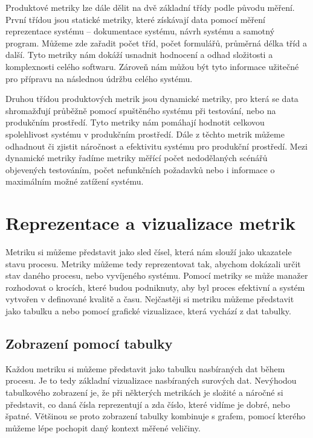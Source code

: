 \documentclass[czech,master]{diploma}
\begin{document}
Produktové metriky lze dále dělit na dvě základní třídy podle původu měření. První třídou jsou statické metriky, které získávají data pomocí měření reprezentace systému -- dokumentace systému, návrh systému a samotný program. Můžeme zde zařadit počet tříd, počet formulářů, průměrná délka tříd a další. Tyto metriky nám dokáží usnadnit hodnocení a odhad složitosti a komplexnosti celého softwaru. Zároveň nám můžou být tyto informace užitečné pro přípravu na následnou údržbu celého systému.

Druhou třídou produktových metrik jsou dynamické metriky, pro která se data shromažďují průběžně pomocí spuštěného systému při testování, nebo na produkčním prostředí. Tyto metriky nám pomáhají hodnotit celkovou spolehlivost systému v produkčním prostředí. Dále z těchto metrik můžeme odhadnout či zjistit náročnost a efektivitu systému pro produkční prostředí. Mezi dynamické metriky řadíme metriky měřící počet nedodělaných scénářů objevených testováním, počet nefunkčních požadavků nebo i informace o maximálním možné zatížení systému.

\section{Reprezentace a vizualizace metrik}
\label{sec:visualisation}
Metriku si můžeme představit jako sled čísel, která nám slouží jako ukazatele stavu procesu. Metriky můžeme tedy reprezentovat tak, abychom dokázali určit stav daného procesu, nebo vyvíjeného systému. Pomocí metriky se může manažer rozhodovat o krocích, které budou podniknuty, aby byl proces efektivní a systém vytvořen v definované kvalitě a času. Nejčastěji si metriku můžeme představit jako tabulku a nebo pomocí grafické vizualizace, která vychází z dat tabulky.


\subsection{Zobrazení pomocí tabulky}
Každou metriku si můžeme představit jako tabulku nasbíraných dat během procesu. Je to tedy základní vizualizace nasbíraných surových dat. Nevýhodou tabulkového zobrazení je, že při některých metrikách je složité a náročné si představit, co daná čísla reprezentují a zda číslo, které vidíme je dobré, nebo špatné. Většinou se proto zobrazení tabulky kombinuje s grafem, pomocí kterého můžeme lépe pochopit daný kontext měřené veličiny.
\end{document}
